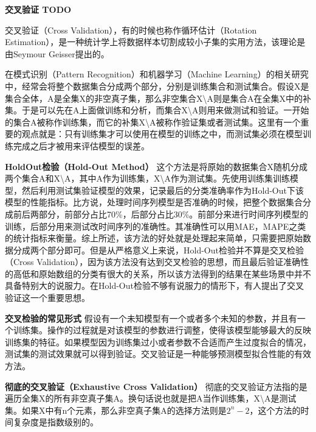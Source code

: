 \documentclass[10pt,a4paper]{ctexbook}
\begin{document}
\textbf{交叉验证{\color{red} TODO}}

交叉验证（Cross Validation），有的时候也称作循环估计（Rotation Estimation），是一种统计学上将数据样本切割成较小子集的实用方法，该理论是由Seymour Geisser提出的。

在模式识别（Pattern Recognition）和机器学习（Machine Learning）的相关研究中，经常会将整个数据集合分成两个部分，分别是训练集合和测试集合。假设X是集合全体，A是全集X的非空真子集，那么非空集合X\textbackslash{A}则是集合A在全集X中的补集。于是可以先在A上面做训练和分析，而集合X\textbackslash{A}则用来做测试和验证。一开始的集合A被称作训练集，而它的补集X\textbackslash{A}被称作验证集或者测试集。这里有一个重要的观点就是：只有训练集才可以使用在模型的训练之中，而测试集必须在模型训练完成之后才被用来评估模型的误差。

\textbf{HoldOut检验（Hold-Out Method）}
这个方法是将原始的数据集合X随机分成两个集合A和X\textbackslash{A}，其中A作为训练集，X\textbackslash{A}作为测试集。先使用训练集训练模型，然后利用测试集验证模型的效果，记录最后的分类准确率作为Hold-Out下该模型的性能指标。比方说，处理时间序列模型是否准确的时候，把整个数据集合分成前后两部分，前部分占比70\%，后部分占比30\%。前部分来进行时间序列模型的训练，后部分用来测试改时间序列的准确性。其准确性可以用MAE，MAPE之类的统计指标来衡量。综上所述，该方法的好处就是处理起来简单，只需要把原始数据分成两个部分即可。但是从严格意义上来说，Hold-Out检验并不算是交叉检验（Cross Validation），因为该方法没有达到交叉检验的思想，而且最后验证准确性的高低和原始数组的分类有很大的关系，所以该方法得到的结果在某些场景中并不具备特别大的说服力。在Hold-Out检验不够有说服力的情形下，有人提出了交叉验证这一个重要思想。

\textbf{交叉检验的常见形式}
假设有一个未知模型有一个或者多个未知的参数，并且有一个训练集。操作的过程就是对该模型的参数进行调整，使得该模型能够最大的反映训练集的特征。如果模型因为训练集过小或者参数不合适而产生过度拟合的情况，测试集的测试效果就可以得到验证。交叉验证是一种能够预测模型拟合性能的有效方法。

\textbf{彻底的交叉验证（Exhaustive Cross Validation）}
彻底的交叉验证方法指的是遍历全集X的所有非空真子集A。换句话说也就是把A当作训练集，X\textbackslash{A}是测试集。如果X中有n个元素，那么非空真子集A的选择方法则是$2^{n}-2$，这个方法的时间复杂度是指数级别的。
\end{document}

